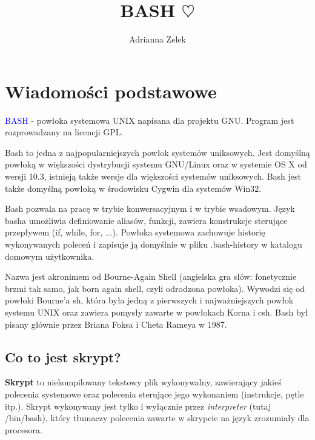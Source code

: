 \documentclass[a4paper,11pt]{article}
\author{Adrianna Zelek}
\title{BASH $\heartsuit$}
\begin{document}
\maketitle
\newpage

\tableofcontents

\newpage
\section{Wiadomości podstawowe} 

\textcolor{blue}{BASH} - powłoka systemowa UNIX napisana dla projektu GNU. Program jest rozprowadzany na licencji GPL.


Bash to jedna z najpopularniejszych powłok systemów uniksowych. Jest domyślną powłoką w większości dystrybucji systemu GNU/Linux oraz w systemie OS X od wersji 10.3, istnieją także wersje dla większości systemów uniksowych. Bash jest także domyślną powłoką w środowisku Cygwin dla systemów Win32.


Bash pozwala na pracę w trybie konwersacyjnym i w trybie wsadowym. Język basha umożliwia definiowanie aliasów, funkcji, zawiera konstrukcje sterujące przepływem (if, while, for, ...). Powłoka systemowa zachowuje historię wykonywanych poleceń i zapisuje ją domyślnie w pliku .bash-history w katalogu domowym użytkownika.

Nazwa jest akronimem od Bourne-Again Shell (angielska gra słów: fonetycznie brzmi tak samo, jak born again shell, czyli odrodzona powłoka). Wywodzi się od powłoki Bourne'a sh, która była jedną z pierwszych i najważniejszych powłok systemu UNIX oraz zawiera pomysły zawarte w powłokach Korna i csh. Bash był pisany głównie przez Briana Foksa i Cheta Rameya w 1987. ~\cite{pa}

\subsection{Co to jest skrypt?} 
\textbf{Skrypt} to niekompilowany tekstowy plik wykonywalny, zawierający jakieś
polecenia systemowe oraz polecenia sterujące jego wykonaniem (instrukcje,
pętle itp.). Skrypt wykonywany jest tylko i wyłącznie przez \textit{interpreter} (tutaj /bin/bash), który tłumaczy polecenia zawarte w skrypcie na język zrozumiały dla procesora.
\end{document}
